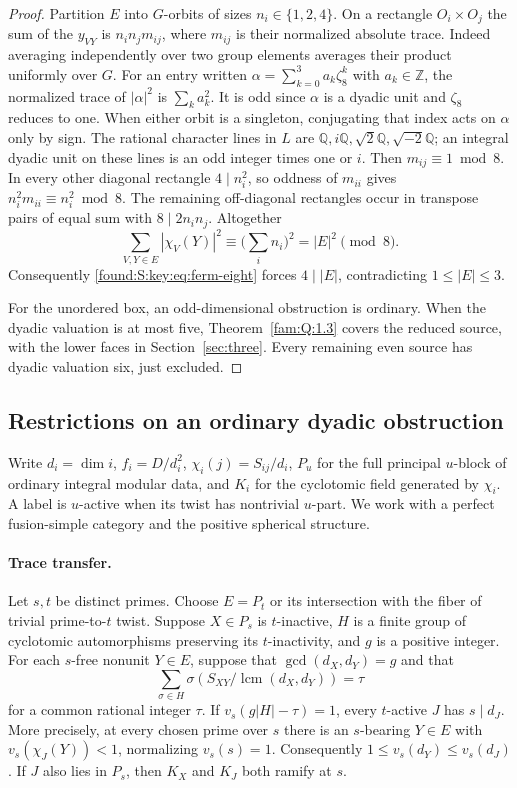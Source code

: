\documentclass[11pt,a4paper]{article}
\numberwithin{equation}{section}
\theoremstyle{remark}
\newcommand{\ZZ}{\mathbb Z}
\newcommand{\QQ}{\mathbb Q}
\begin{document}
\begin{proof}
Partition $E$ into $G$-orbits of sizes $n_i\in\{1,2,4\}$. On a
rectangle $O_i\times O_j$ the sum of the $y_{VY}$ is
$n_i n_j m_{ij}$, where $m_{ij}$ is their normalized absolute
trace. Indeed averaging independently over two group elements
averages their product uniformly over $G$. For an entry written
$\alpha=\sum_{k=0}^3 a_k\zeta_8^k$ with $a_k\in\ZZ$, the normalized
trace of $|\alpha|^2$ is $\sum_k a_k^2$. It is odd since $\alpha$
is a dyadic unit and $\zeta_8$ reduces to one. When either orbit
is a singleton, conjugating that index acts on $\alpha$ only by sign.
The rational character lines in $L$ are
$\QQ,i\QQ,\sqrt2\QQ,\sqrt{-2}\QQ$; an integral dyadic unit on these
lines is an odd integer times one or $i$. Then $m_{ij}\equiv1\bmod8$.
In every other diagonal rectangle $4\mid n_i^2$, so oddness of
$m_{ii}$ gives $n_i^2m_{ii}\equiv n_i^2\bmod8$. The remaining
off-diagonal rectangles occur in transpose pairs of equal sum with
$8\mid2n_i n_j$. Altogether
\[
     \sum_{V,Y\in E}|\chi_V(Y)|^2\equiv
     \Big(\sum_i n_i\Big)^2=|E|^2\pmod8 .
\]
Consequently \eqref{found:S:key:eq:ferm-eight} forces $4\mid |E|$, contradicting
$1\le |E|\le3$.

For the unordered box, an odd-dimensional obstruction is ordinary.
When the dyadic valuation is at most five, Theorem~\ref{fam:Q:1.3} covers the reduced source, with the lower
faces in Section~\ref{sec:three}. Every remaining even source has dyadic valuation
six, just excluded.
\end{proof}

\subsection{Restrictions on an ordinary dyadic obstruction}\label{found:S:6}
Write $d_i=\dim i$, $f_i=D/d_i^2$, $\chi_i(j)=S_{ij}/d_i$,
$P_u$ for the full principal $u$-block of ordinary integral modular data,
and $K_i$ for the cyclotomic field generated by $\chi_i$.
A label is $u$-active when its twist has nontrivial $u$-part.
We work with a perfect fusion-simple category and the positive spherical structure.

\paragraph{Trace transfer.}
Let $s,t$ be distinct primes. Choose $E=P_t$ or its intersection with the
fiber of trivial prime-to-$t$ twist. Suppose $X\in P_s$ is $t$-inactive,
$H$ is a finite group of cyclotomic automorphisms preserving its
$t$-inactivity, and $g$ is a positive integer. For each $s$-free nonunit
$Y\in E$, suppose that $\gcd(d_X,d_Y)=g$ and that
\[
 \sum_{\sigma\in H}\sigma\!\left(S_{XY}/\operatorname{lcm}(d_X,d_Y)\right)=\tau
\]
for a common rational integer $\tau$. If $v_s(g|H|-\tau)=1$, every
$t$-active $J$ has $s\mid d_J$. More precisely, at every chosen prime over
$s$ there is an $s$-bearing $Y\in E$ with
$v_s(\chi_J(Y))<1$, normalizing $v_s(s)=1$.
Consequently $1\le v_s(d_Y)\le v_s(d_J)$. If $J$ also lies in $P_s$,
then $K_X$ and $K_J$ both ramify at $s$.
\end{document}
